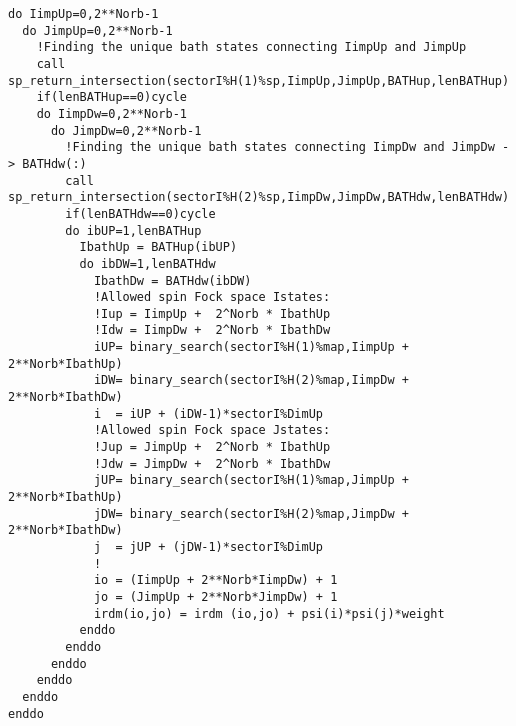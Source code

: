\documentclass[preprint,3p,10pt]{elsarticle}
\begin{document}
\begin{lstlisting}[style=fstyle,numbers=none,basicstyle={\scriptsize\ttfamily}]
do IimpUp=0,2**Norb-1
  do JimpUp=0,2**Norb-1
    !Finding the unique bath states connecting IimpUp and JimpUp
    call sp_return_intersection(sectorI%H(1)%sp,IimpUp,JimpUp,BATHup,lenBATHup)
    if(lenBATHup==0)cycle
    do IimpDw=0,2**Norb-1
      do JimpDw=0,2**Norb-1
        !Finding the unique bath states connecting IimpDw and JimpDw -> BATHdw(:)
        call sp_return_intersection(sectorI%H(2)%sp,IimpDw,JimpDw,BATHdw,lenBATHdw)
        if(lenBATHdw==0)cycle
        do ibUP=1,lenBATHup
          IbathUp = BATHup(ibUP)
          do ibDW=1,lenBATHdw
            IbathDw = BATHdw(ibDW)
            !Allowed spin Fock space Istates:
            !Iup = IimpUp +  2^Norb * IbathUp
            !Idw = IimpDw +  2^Norb * IbathDw
            iUP= binary_search(sectorI%H(1)%map,IimpUp + 2**Norb*IbathUp)
            iDW= binary_search(sectorI%H(2)%map,IimpDw + 2**Norb*IbathDw)
            i  = iUP + (iDW-1)*sectorI%DimUp
            !Allowed spin Fock space Jstates:
            !Jup = JimpUp +  2^Norb * IbathUp
            !Jdw = JimpDw +  2^Norb * IbathDw
            jUP= binary_search(sectorI%H(1)%map,JimpUp + 2**Norb*IbathUp)
            jDW= binary_search(sectorI%H(2)%map,JimpDw + 2**Norb*IbathDw)
            j  = jUP + (jDW-1)*sectorI%DimUp
            ! 
            io = (IimpUp + 2**Norb*IimpDw) + 1
            jo = (JimpUp + 2**Norb*JimpDw) + 1
            irdm(io,jo) = irdm (io,jo) + psi(i)*psi(j)*weight
          enddo
        enddo
      enddo
    enddo
  enddo
enddo
\end{lstlisting}
\end{document}
